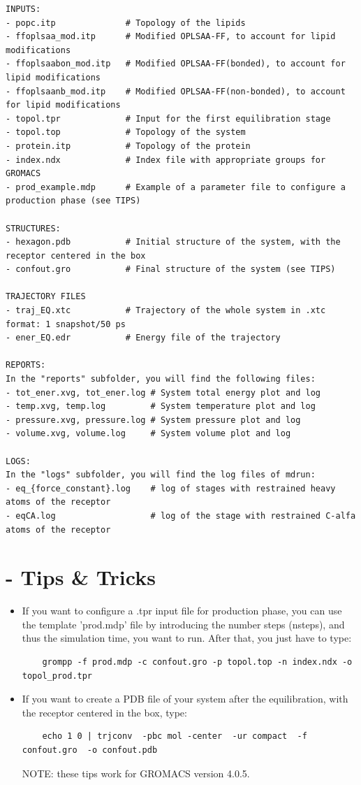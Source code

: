 \documentclass[10pt, oneside, pdftex]{article}
\begin{document}
\begin{Verbatim}
INPUTS:
- popc.itp              # Topology of the lipids
- ffoplsaa_mod.itp      # Modified OPLSAA-FF, to account for lipid modifications
- ffoplsaabon_mod.itp   # Modified OPLSAA-FF(bonded), to account for lipid modifications
- ffoplsaanb_mod.itp    # Modified OPLSAA-FF(non-bonded), to account for lipid modifications
- topol.tpr             # Input for the first equilibration stage
- topol.top             # Topology of the system
- protein.itp           # Topology of the protein
- index.ndx             # Index file with appropriate groups for GROMACS
- prod_example.mdp      # Example of a parameter file to configure a production phase (see TIPS)

STRUCTURES:
- hexagon.pdb           # Initial structure of the system, with the receptor centered in the box
- confout.gro           # Final structure of the system (see TIPS)

TRAJECTORY FILES
- traj_EQ.xtc           # Trajectory of the whole system in .xtc format: 1 snapshot/50 ps        
- ener_EQ.edr           # Energy file of the trajectory

REPORTS:
In the "reports" subfolder, you will find the following files:
- tot_ener.xvg, tot_ener.log # System total energy plot and log
- temp.xvg, temp.log         # System temperature plot and log
- pressure.xvg, pressure.log # System pressure plot and log
- volume.xvg, volume.log     # System volume plot and log

LOGS:
In the "logs" subfolder, you will find the log files of mdrun:
- eq_{force_constant}.log    # log of stages with restrained heavy atoms of the receptor
- eqCA.log                   # log of the stage with restrained C-alfa atoms of the receptor
\end{Verbatim}

\section*{ - Tips \& Tricks}
\begin{itemize}
\item{If you want to configure a .tpr input file for production phase, you
can use the  template 'prod.mdp' file by introducing  the number steps
(nsteps), and thus  the simulation time, you want  to run. After that,
you just have to type:
\begin{Verbatim}
    grompp -f prod.mdp -c confout.gro -p topol.top -n index.ndx -o topol_prod.tpr
\end{Verbatim}
}

\item{If  you  want  to  create  a  PDB file  of  your  system  after  the
equilibration, with the receptor centered in the box, type: 
\begin{Verbatim}
    echo 1 0 | trjconv  -pbc mol -center  -ur compact  -f confout.gro  -o confout.pdb
\end{Verbatim}
NOTE: these tips work for GROMACS version 4.0.5.}
\end{itemize}
\end{document}
